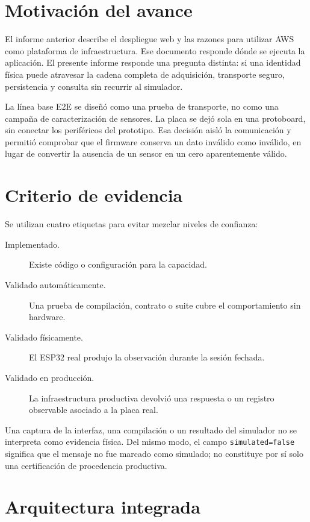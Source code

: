 \documentclass[10pt,a4paper]{article}
\newcommand{\code}[1]{\texttt{\small #1}}
\begin{document}
\section{Motivación del avance}

El informe anterior describe el despliegue web y las razones para utilizar AWS
como plataforma de infraestructura. Ese documento responde dónde se ejecuta la
aplicación. El presente informe responde una pregunta distinta: si una identidad
física puede atravesar la cadena completa de adquisición, transporte seguro,
persistencia y consulta sin recurrir al simulador.

La línea base E2E se diseñó como una prueba de transporte, no como una campaña
de caracterización de sensores. La placa se dejó sola en una protoboard, sin
conectar los periféricos del prototipo. Esa decisión aisló la comunicación y
permitió comprobar que el firmware conserva un dato inválido como inválido, en
lugar de convertir la ausencia de un sensor en un cero aparentemente válido.

\section{Criterio de evidencia}

Se utilizan cuatro etiquetas para evitar mezclar niveles de confianza:

\begin{description}
  \item[Implementado.] Existe código o configuración para la capacidad.
  \item[Validado automáticamente.] Una prueba de compilación, contrato o suite
        cubre el comportamiento sin hardware.
  \item[Validado físicamente.] El ESP32 real produjo la observación durante la
        sesión fechada.
  \item[Validado en producción.] La infraestructura productiva devolvió una
        respuesta o un registro observable asociado a la placa real.
\end{description}

Una captura de la interfaz, una compilación o un resultado del simulador no se
interpreta como evidencia física. Del mismo modo, el campo
\code{simulated=false} significa que el mensaje no fue marcado como simulado;
no constituye por sí solo una certificación de procedencia productiva.

\section{Arquitectura integrada}
\end{document}
